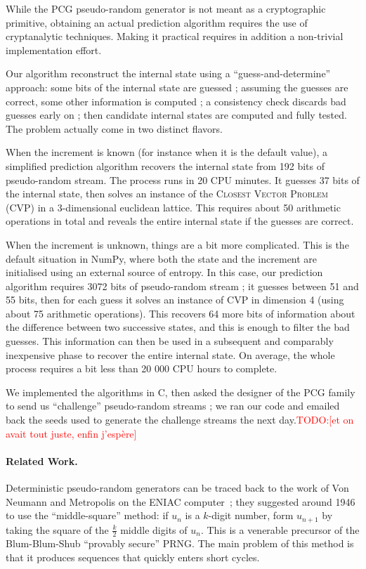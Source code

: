 \documentclass[submission,svgnames,journal=tosc]{iacrtrans}
\newcommand{\todo}[1]{\textcolor{red}{TODO:[#1]}}
\begin{document}
While the \textsf{PCG} pseudo-random generator is not meant as a cryptographic
primitive, obtaining an actual prediction algorithm requires the use of
cryptanalytic techniques. Making it practical requires in addition a non-trivial
implementation effort.

Our algorithm reconstruct the internal state using a ``guess-and-determine''
approach: some bits of the internal state are guessed ; assuming the guesses are
correct, some other information is computed ; a consistency check discards bad
guesses early on ; then candidate internal states are computed and fully
tested. The problem actually come in two distinct flavors.

When the increment is known (for instance when it is the default value), a
simplified prediction algorithm recovers the internal state from 192 bits of
pseudo-random stream. The process runs in 20 CPU minutes. It guesses 37 bits of
the internal state, then solves an instance of the \textsc{Closest Vector
  Problem} (CVP) in a 3-dimensional euclidean lattice. This requires about 50
arithmetic operations in total and reveals the entire internal state if the
guesses are correct.

When the increment is unknown, things are a bit more complicated. This is the
default situation in \textsf{NumPy}, where both the state and the increment are
initialised using an external source of entropy. In this case, our prediction
algorithm requires 3072 bits of pseudo-random stream ; it guesses between 51 and
55 bits, then for each guess it solves an instance of CVP in dimension 4 (using
about 75 arithmetic operations). This recovers 64 more bits of information about
the difference between two successive states, and this is enough to filter the
bad guesses. This information can then be used in a subsequent and comparably
inexpensive phase to recover the entire internal state. On average, the whole
process requires a bit less than 20 000 CPU hours to complete.

We implemented the algorithms in \textsf{C}, then asked the designer of the PCG
family to send us ``challenge'' pseudo-random streams ; we ran our code and
emailed back the seeds used to generate the challenge streams the next day.\todo{et on avait tout juste, enfin j'espère}

\paragraph{Related Work.} Deterministic pseudo-random generators can be traced
back to the work of Von Neumann and Metropolis on the ENIAC
computer~\cite{vonNeumann1951}; they suggested around 1946 to use the
``middle-square'' method: if $u_n$ is a $k$-digit number, form $u_{n+1}$ by
taking the square of the $\frac{k}{2}$ middle digits of $u_n$. This is a
venerable precursor of the Blum-Blum-Shub ``provably secure'' PRNG. The main
problem of this method is that it produces sequences that quickly enters short
cycles.
\end{document}
